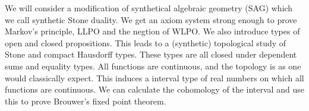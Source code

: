 We will consider a modification of synthetical algebraic geometry (SAG) which we call synthetic Stone duality.
We get an axiom system strong enough to prove Markov's principle, LLPO and the negtion of WLPO. 
We also introduce types of open and closed propositions. 
This leads to a (synthetic) topological study of Stone and compact Hausdorff types. 
These types are all closed under dependent sums and equality types. 
All functions are continuous, and the topology is as one would classically expect.
This induces a interval type of real numbers on which all functions are continuous. 
We can calculate the cohomology of the interval and use this to prove Brouwer's fixed point theorem. 

